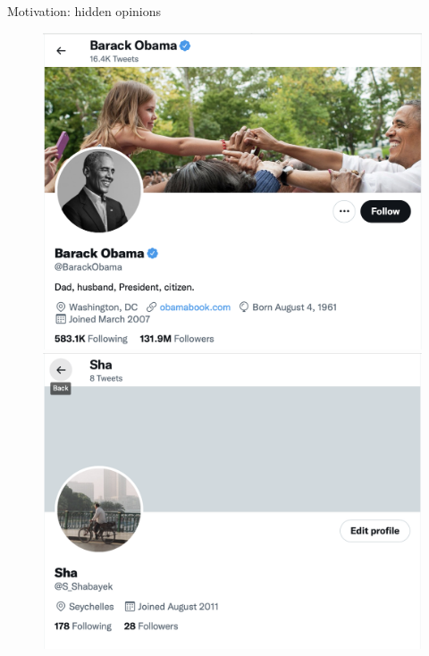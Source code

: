 \documentclass[xcolor=table,handout]{beamer}
\begin{document}
\begin{frame}{Motivation: hidden opinions}
\begin{figure}
\centering
\begin{minipage}{.5\textwidth}
  \centering
  \includegraphics[scale = 0.25]{./img/shaden_tw.png}
\end{minipage}%
\begin{minipage}{.4\textwidth}
  \centering
  \includegraphics[scale = 0.25]{./img/obama_tw.png}
\end{minipage}
\end{figure}
\end{frame}
\end{document}
